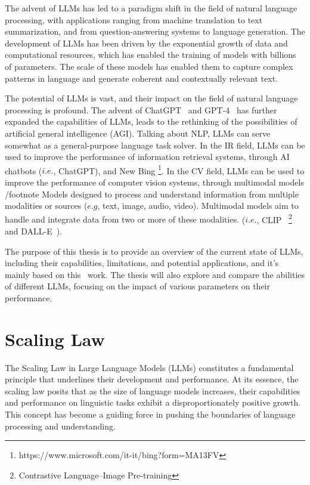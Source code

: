 The advent of LLMs has led to a paradigm shift in the field of natural language processing, with applications ranging from machine translation to text summarization, and from question-answering systems to language generation.
The development of LLMs has been driven by the exponential growth of data and computational resources, which has enabled the training of models with billions of parameters.
The scale of these models has enabled them to capture complex patterns in language and generate coherent and contextually relevant text.

The potential of LLMs is vast, and their impact on the field of natural language processing is profound.
The advent of ChatGPT~\cite{chatgpt} and GPT-4~\cite{gpt4} has further expanded the capabilities of LLMs, leads to the rethinking of the possibilities of artificial general intelligence (AGI).
Talking about NLP, LLMs can serve somewhat as a general-purpose language task solver.
In the IR field, LLMs can be used to improve the performance of information retrieval systems, through AI chatbots ($i.e.$, ChatGPT), and New Bing \footnote{https://www.microsoft.com/it-it/bing?form=MA13FV}.
In the CV field, LLMs can be used to improve the performance of computer vision systems, through multimodal models /footnote{
    Models designed to process and understand information from multiple modalities or sources ($e.g$, text, image, audio, video).
    Multimodal models aim to handle and integrate data from two or more of these modalities.
} ($i.e.$, CLIP~\cite{clip} \footnote{Contrastive Language–Image Pre-training} and DALL-E~\cite{dall-e}).

The purpose of this thesis is to provide an overview of the current state of LLMs, including their capabilities, limitations, and potential applications, and it's mainly based on this~\cite{survey} work.
The thesis will also explore and compare the abilities of different LLMs, focusing on the impact of various parameters on their performance.


\section{Scaling Law}
\label{sec:scaling-law-in-large-language-models}

The Scaling Law in Large Language Models (LLMs) constitutes a fundamental principle that underlines their development and performance.
At its essence, the scaling law posits that as the size of language models increases, their capabilities and performance on linguistic tasks exhibit a disproportionately positive growth.
This concept has become a guiding force in pushing the boundaries of language processing and understanding.

